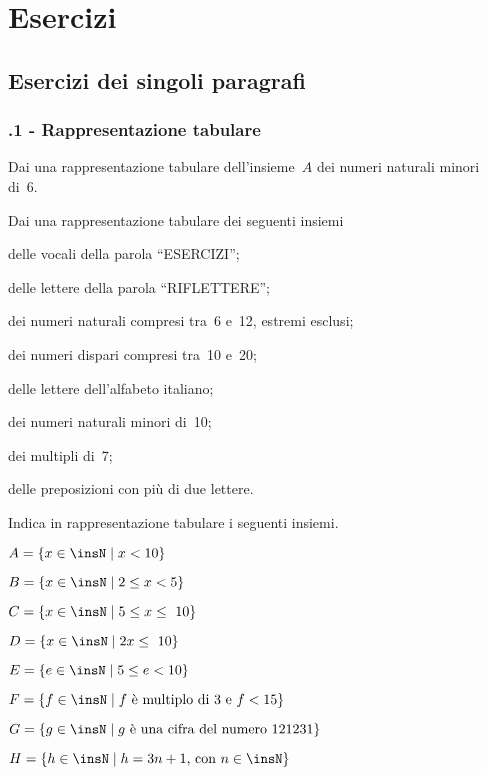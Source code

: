 \section{Esercizi}
\subsection{Esercizi dei singoli paragrafi}
\subsubsection*{\thechapter.1 - Rappresentazione tabulare}

\begin{esercizio}
\label{ese:6.1}
Dai una rappresentazione tabulare dell'insieme~$A$ dei numeri naturali minori di~6.
\end{esercizio}

\begin{esercizio}
\label{ese:6.2}
Dai una rappresentazione tabulare dei seguenti insiemi
\begin{enumeratea}
 \item delle vocali della parola ``ESERCIZI'';
 \item delle lettere della parola ``RIFLETTERE'';
 \item dei numeri naturali compresi tra~6 e~12, estremi esclusi;
 \item dei numeri dispari compresi tra~10 e~20;
 \item delle lettere dell'alfabeto italiano;
 \item dei numeri naturali minori di~10;
 \item dei multipli di~7;
 \item delle preposizioni con più di due lettere.
\end{enumeratea}
\end{esercizio}

\begin{esercizio}
 \label{ese:6.3}
Indica in rappresentazione tabulare i seguenti insiemi.
\TabPositions{7.5cm}
\begin{enumeratea}
 \item $A=\{x\in\insN\mid x<10\}$\tab\dotfill
 \item $B=\{x\in\insN\mid 2\le x<5\}$\tab\dotfill
 \item $C=\{x\in\insN\mid 5\le x\le~10\}$\tab\dotfill
 \item $D=\{x\in\insN\mid 2x\le~10\}$ \tab\dotfill
 \item $E=\{e\in\insN\mid 5\le e<10\}$\tab\dotfill
 \item $F=\{f\in\insN\mid f\text{ è multiplo di~3 e } f<15\}$\tab\dotfill
 \item $G=\{g\in\insN\mid g\text{ è una cifra del numero }121231\}$\tab\dotfill
 \item $H=\{h\in\insN\mid h=3n+1\text{, con }n\in\insN\}$\tab\dotfill
\end{enumeratea}
\end{esercizio}

